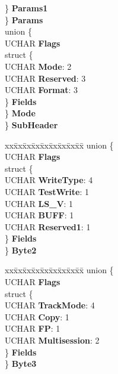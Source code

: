 \begin{DoxyCompactItemize}
\begin{tabbing}
\>\>\} {\bfseries Params1}\\
\>\} {\bfseries Params}\\
\>union \{\\
\>\>UCHAR {\bfseries Flags}\\
\>\>struct \{\\
\>\>\>UCHAR {\bfseries Mode}: 2\\
\>\>\>UCHAR {\bfseries Reserved}: 3\\
\>\>\>UCHAR {\bfseries Format}: 3\\
\>\>\} {\bfseries Fields}\\
\>\} {\bfseries Mode}\\
\} {\bfseries SubHeader}\\

\end{tabbing}\item 
\mbox{\label{struct___m_o_d_e___w_r_i_t_e___p_a_r_a_m_s___p_a_g_e_a089c57f48385ac973e0d48eb721904c4}} 
\begin{tabbing}
xx\=xx\=xx\=xx\=xx\=xx\=xx\=xx\=xx\=\kill
union \{\\
\>UCHAR {\bfseries Flags}\\
\>struct \{\\
\>\>UCHAR {\bfseries WriteType}: 4\\
\>\>UCHAR {\bfseries TestWrite}: 1\\
\>\>UCHAR {\bfseries LS\_V}: 1\\
\>\>UCHAR {\bfseries BUFF}: 1\\
\>\>UCHAR {\bfseries Reserved1}: 1\\
\>\} {\bfseries Fields}\\
\} {\bfseries Byte2}\\

\end{tabbing}\item 
\mbox{\label{struct___m_o_d_e___w_r_i_t_e___p_a_r_a_m_s___p_a_g_e_a1cadc756f20523a6c326de844696810d}} 
\begin{tabbing}
xx\=xx\=xx\=xx\=xx\=xx\=xx\=xx\=xx\=\kill
union \{\\
\>UCHAR {\bfseries Flags}\\
\>struct \{\\
\>\>UCHAR {\bfseries TrackMode}: 4\\
\>\>UCHAR {\bfseries Copy}: 1\\
\>\>UCHAR {\bfseries FP}: 1\\
\>\>UCHAR {\bfseries Multisession}: 2\\
\>\} {\bfseries Fields}\\
\} {\bfseries Byte3}\\


\end{tabbing}
\end{DoxyCompactItemize}

